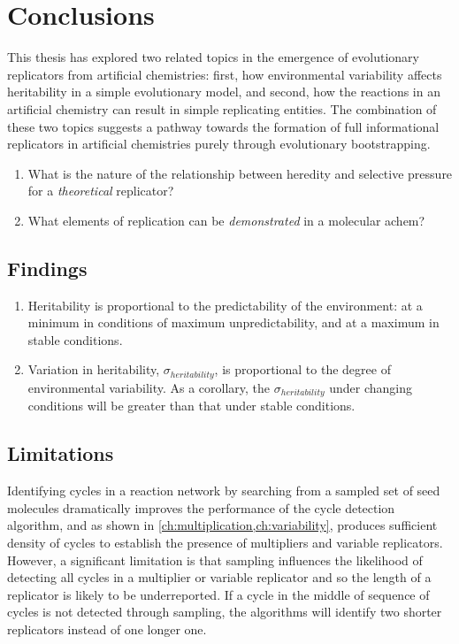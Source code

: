 \chapter{Conclusions}\label{thesis-conclusions}

This thesis has explored two related topics in the emergence of evolutionary replicators from artificial chemistries: first, how environmental variability affects heritability in a simple evolutionary model, and second, how the reactions in an artificial chemistry can result in simple replicating entities. The combination of these two topics suggests a pathway towards the formation of full informational replicators in artificial chemistries purely through evolutionary bootstrapping.

\begin{enumerate}[label=RQ\arabic*:]
\item What is the nature of the relationship between heredity and selective pressure for a \emph{theoretical} replicator?
\item What elements of replication can be \emph{demonstrated} in a molecular \gls{achem}?
\end{enumerate}

\section{Findings}

\begin{enumerate}
\item Heritability is proportional to the predictability of the environment: at a minimum in conditions of maximum unpredictability, and at a maximum in stable conditions.
\item Variation in heritability, $\sigma_{heritability}$, is proportional to the degree of environmental variability. As a corollary, the $\sigma_{heritability}$ under changing conditions will be greater than that under stable conditions.
\end{enumerate}

\section{Limitations}\label{sec:limitations}

Identifying cycles in a reaction network by searching from a sampled set of seed molecules dramatically improves the performance of the cycle detection algorithm, and as shown in \cref{ch:multiplication,ch:variability}, produces sufficient density of cycles to establish the presence of multipliers and variable replicators. However, a significant limitation is that sampling influences the likelihood of detecting all cycles in a multiplier or variable replicator and so the length of a replicator is likely to be underreported. If a cycle in the middle of sequence of cycles is not detected through sampling, the algorithms will identify two shorter replicators instead of one longer one. 

